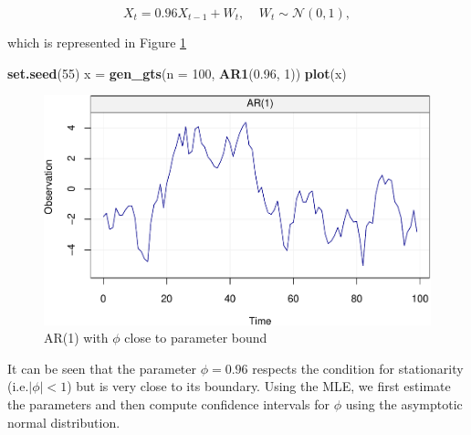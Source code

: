 \documentclass[]{book}
\newenvironment{Shaded}{\begin{snugshade}}{\end{snugshade}}
\newcommand{\KeywordTok}[1]{\textcolor[rgb]{0.13,0.29,0.53}{\textbf{#1}}}
\newcommand{\DataTypeTok}[1]{\textcolor[rgb]{0.13,0.29,0.53}{#1}}
\newcommand{\DecValTok}[1]{\textcolor[rgb]{0.00,0.00,0.81}{#1}}
\newcommand{\FloatTok}[1]{\textcolor[rgb]{0.00,0.00,0.81}{#1}}
\newcommand{\StringTok}[1]{\textcolor[rgb]{0.31,0.60,0.02}{#1}}
\newcommand{\CommentTok}[1]{\textcolor[rgb]{0.56,0.35,0.01}{\textit{#1}}}
\newcommand{\OtherTok}[1]{\textcolor[rgb]{0.56,0.35,0.01}{#1}}
\newcommand{\OperatorTok}[1]{\textcolor[rgb]{0.81,0.36,0.00}{\textbf{#1}}}
\newcommand{\NormalTok}[1]{#1}
\theoremstyle{definition}
\theoremstyle{definition}
\theoremstyle{definition}
\theoremstyle{remark}
\begin{document}
\[X_t = 0.96 X_{t-1} + W_t, \;\;\;\; W_t \sim \mathcal{N}(0,1),\]

which is represented in Figure \ref{fig:simAR1ci}

\begin{Shaded}
\begin{Highlighting}[]
\KeywordTok{set.seed}\NormalTok{(}\DecValTok{55}\NormalTok{)}
\NormalTok{x =}\StringTok{ }\KeywordTok{gen_gts}\NormalTok{(}\DataTypeTok{n =} \DecValTok{100}\NormalTok{, }\KeywordTok{AR1}\NormalTok{(}\FloatTok{0.96}\NormalTok{, }\DecValTok{1}\NormalTok{))}
\KeywordTok{plot}\NormalTok{(x)}
\end{Highlighting}
\end{Shaded}

\begin{figure}

{\centering \includegraphics{ts_files/figure-latex/simAR1ci-1} 

}

\caption{AR(1) with $\phi$ close to parameter bound}\label{fig:simAR1ci}
\end{figure}

It can be seen that the parameter \(\phi = 0.96\) respects the condition
for stationarity (i.e.\(\left| \phi \right| < 1\)) but is very close to
its boundary. Using the MLE, we first estimate the parameters and then
compute confidence intervals for \(\phi\) using the asymptotic normal
distribution.

\begin{Shaded}
\end{Shaded}
\end{document}
